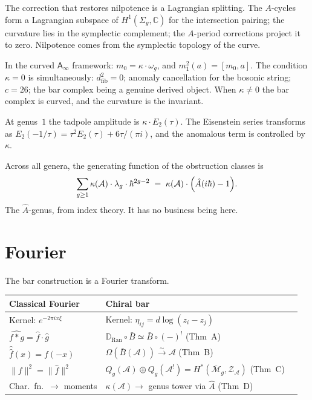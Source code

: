 \documentclass[11pt]{article}
\newcommand{\cA}{\mathcal{A}}
\newcommand{\cM}{\mathcal{M}}
\newcommand{\cZ}{\mathcal{Z}}
\newcommand{\B}{\bar{B}}
\newcommand{\C}{\mathbb{C}}
\newcommand{\Ainf}{\mathsf{A}_{\infty}}
\newcommand{\Ran}{\operatorname{Ran}}
\newcommand{\dfib}{d_{\mathrm{fib}}}
\begin{document}
The correction that restores nilpotence is a Lagrangian splitting.
The $A$-cycles form a Lagrangian subspace of $H^1(\Sigma_g, \C)$
for the intersection pairing; the curvature lies in the symplectic
complement; the $A$-period corrections project it to zero.
Nilpotence comes from the symplectic topology of the curve.

In the curved $\Ainf$ framework: $m_0 = \kappa \cdot \omega_g$,
and $m_1^2(a) = [m_0, a]$.  The condition $\kappa = 0$ is
simultaneously: $\dfib^2 = 0$; anomaly cancellation for the
bosonic string; $c = 26$; the bar complex being a genuine derived
object.  When $\kappa \neq 0$ the bar complex is curved, and the
curvature is the invariant.

At genus~$1$ the tadpole amplitude is $\kappa \cdot E_2(\tau)$.
The Eisenstein series transforms as
$E_2(-1/\tau) = \tau^2 E_2(\tau) + 6\tau/(\pi i)$, and the
anomalous term is controlled by $\kappa$.

Across all genera, the generating function of the obstruction
classes is
\[
\sum_{g \geq 1} \kappa(\cA) \cdot \lambda_g \cdot \hbar^{2g-2}
\;=\;
\kappa(\cA) \cdot \Bigl(\hat{A}(i\hbar) - 1\Bigr).
\]
The $\hat{A}$-genus, from index theory.  It has no business
being here.


\section{Fourier}
\label{sec:fourier}

The bar construction is a Fourier transform.

\begin{center}
\small
\begin{tabular}{lll}
\textbf{Classical Fourier} & \textbf{Chiral bar} \\
\hline
Kernel: $e^{-2\pi i x\xi}$
  & Kernel: $\eta_{ij} = d\log(z_i - z_j)$ \\[3pt]
$\widehat{f * g} = \hat{f} \cdot \hat{g}$
  & $\mathbb{D}_{\Ran} \circ \B \simeq \B \circ (-)^!$
  \quad(Thm~A) \\[3pt]
$\hat{\hat{f}}(x) = f(-x)$
  & $\Omega(\B(\cA)) \xrightarrow{\sim} \cA$
  \quad(Thm~B) \\[3pt]
$\|f\|^2 = \|\hat{f}\|^2$
  & $Q_g(\cA) \oplus Q_g(\cA^!) = H^*(\overline{\cM}_g, \cZ_\cA)$
  \quad(Thm~C) \\[3pt]
Char.\ fn.\ $\to$ moments
  & $\kappa(\cA) \to$ genus tower via $\hat{A}$
  \quad(Thm~D)
\end{tabular}
\end{center}
\end{document}
